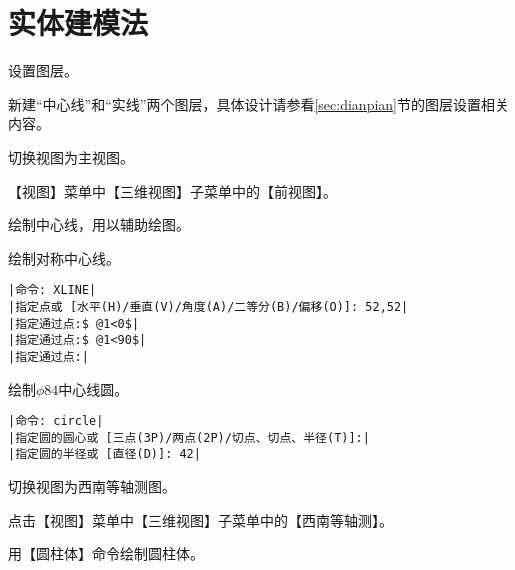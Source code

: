 \section{实体建模法}
\begin{procedure}
\item 设置图层。

新建“中心线”和“实线”两个图层，具体设计请参看\ref{sec:dianpian}节的图层设置相关内容。
\item 切换视图为主视图。

【视图】菜单中【三维视图】子菜单中的【前视图】。
\item 绘制中心线，用以辅助绘图。

绘制对称中心线。
\begin{lstlisting}
|命令: XLINE|
|指定点或 [水平(H)/垂直(V)/角度(A)/二等分(B)/偏移(O)]: 52,52|
|指定通过点:$ @1<0$|
|指定通过点:$ @1<90$|
|指定通过点:|
\end{lstlisting}
绘制$\phi 84$中心线圆。
\begin{lstlisting}
|命令: circle|
|指定圆的圆心或 [三点(3P)/两点(2P)/切点、切点、半径(T)]:|
|指定圆的半径或 [直径(D)]: 42|
\end{lstlisting}
\item 切换视图为西南等轴测图。

点击【视图】菜单中【三维视图】子菜单中的【西南等轴测】。
\item 用【圆柱体】命令绘制圆柱体。


\end{procedure}
